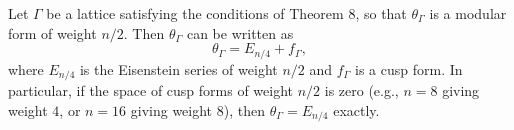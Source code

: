 Let $\Gamma$ be a lattice satisfying the conditions of Theorem 8, so that $\theta_\Gamma$ is a modular form of weight $n/2$. Then $\theta_\Gamma$ can be written as
$$\theta_\Gamma = E_{n/4} + f_\Gamma,$$
where $E_{n/4}$ is the Eisenstein series of weight $n/2$ and $f_\Gamma$ is a cusp form. In particular, if the space of cusp forms of weight $n/2$ is zero (e.g., $n = 8$ giving weight $4$, or $n = 16$ giving weight $8$), then $\theta_\Gamma = E_{n/4}$ exactly.
